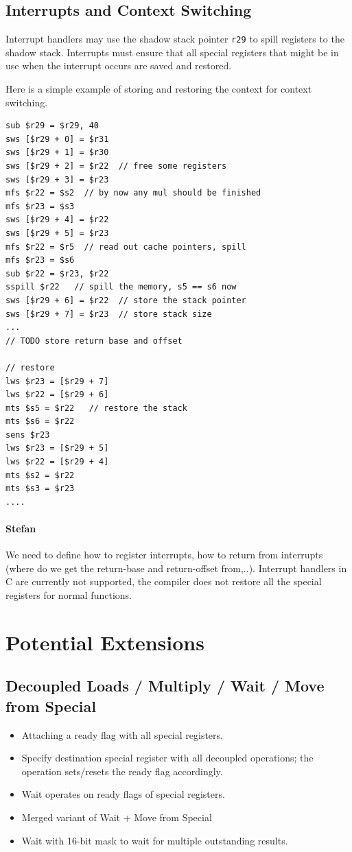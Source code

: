 \documentclass{IEEEtran}
\newcommand{\comment}[3]{\paragraph*{\textbf{#1}}{\color{#3}#2}}
\newcommand{\stefan}[1]{\comment{Stefan}{#1}{RoyalPurple}}
\begin{document}
\subsection{Interrupts and Context Switching}

Interrupt handlers may use the shadow stack pointer \texttt{r29} to spill registers
to the shadow stack. Interrupts must ensure that all special registers that might be in use 
when the interrupt occurs are saved and restored.

Here is a simple example of storing and restoring the context for context switching.
\begin{verbatim}
sub $r29 = $r29, 40
sws [$r29 + 0] = $r31
sws [$r29 + 1] = $r30
sws [$r29 + 2] = $r22  // free some registers
sws [$r29 + 3] = $r23  
mfs $r22 = $s2  // by now any mul should be finished
mfs $r23 = $s3
sws [$r29 + 4] = $r22
sws [$r29 + 5] = $r23
mfs $r22 = $r5  // read out cache pointers, spill
mfs $r23 = $s6
sub $r22 = $r23, $r22
sspill $r22   // spill the memory, s5 == s6 now
sws [$r29 + 6] = $r22  // store the stack pointer
sws [$r29 + 7] = $r23  // store stack size
... 
// TODO store return base and offset

// restore
lws $r23 = [$r29 + 7]
lws $r22 = [$r29 + 6]
mts $s5 = $r22   // restore the stack
mts $s6 = $r22
sens $r23
lws $r23 = [$r29 + 5]
lws $r22 = [$r29 + 4]
mts $s2 = $r22
mts $s3 = $r23
....
\end{verbatim}

\stefan{We need to define how to register interrupts, how to return from interrupts (where do we get
the return-base and return-offset from,..). Interrupt handlers in C are currently not supported, 
the compiler does not restore all the special registers for normal functions.}


\section{Potential Extensions}

\subsection{Decoupled Loads / Multiply / Wait / Move from Special}

\begin{itemize}
  \item Attaching a ready flag with all special registers.
  \item Specify destination special register with all decoupled operations; the
        operation sets/resets the ready flag accordingly.
  \item Wait operates on ready flags of special registers.
  \item Merged variant of Wait + Move from Special
  \item Wait with 16-bit mask to wait for multiple outstanding results.
\end{itemize}
\end{document}

